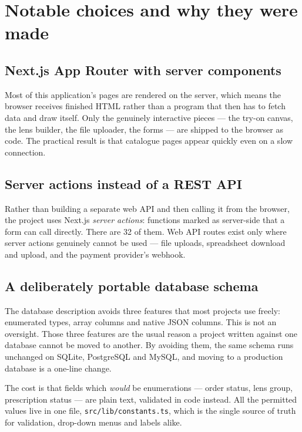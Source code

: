 \documentclass[11pt,a4paper]{report}
\newcommand{\code}[1]{\texttt{\small #1}}
\begin{document}
\section{Notable choices and why they were made}

\subsection{Next.js App Router with server components}

Most of this application's pages are rendered on the server, which means the
browser receives finished HTML rather than a program that then has to fetch
data and draw itself. Only the genuinely interactive pieces --- the try-on
canvas, the lens builder, the file uploader, the forms --- are shipped to the
browser as code. The practical result is that catalogue pages appear quickly
even on a slow connection.

\subsection{Server actions instead of a REST API}

Rather than building a separate web API and then calling it from the browser,
the project uses Next.js \emph{server actions}: functions marked as
server-side that a form can call directly. There are 32 of them. Web API
routes exist only where server actions genuinely cannot be used --- file
uploads, spreadsheet download and upload, and the payment provider's webhook.

\subsection{A deliberately portable database schema}

The database description avoids three features that most projects use freely:
enumerated types, array columns and native JSON columns. This is not an
oversight. Those three features are the usual reason a project written against
one database cannot be moved to another. By avoiding them, the same schema
runs unchanged on SQLite, PostgreSQL and MySQL, and moving to a production
database is a one-line change.

The cost is that fields which \emph{would} be enumerations --- order status,
lens group, prescription status --- are plain text, validated in code instead.
All the permitted values live in one file, \code{src/lib/constants.ts}, which
is the single source of truth for validation, drop-down menus and labels
alike.
\end{document}
